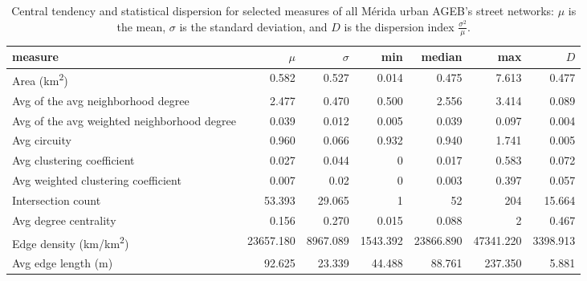 \begin{landscape}
\begin{table}[htbp]
  \centering
  \caption{Central tendency and statistical dispersion for selected measures of all Mérida urban AGEB's street networks: $\mu$ is the mean, $\sigma$ is the standard deviation, and $D$ is the dispersion index $\frac{\sigma ^ 2}{\mu}$.}
  \label{tab:measures_urban_agebs}
  \small
  \begin{tabular}{ l r r r r r r }
    \toprule
    measure                                          & $\mu$          & $\sigma$       & min            & median         & max            & $D$            \\
    \midrule
    Area (km\textsuperscript{2})                     & 0.582        & 0.527        & 0.014         & 0.475        & 7.613       & 0.477       \\
    Avg of the avg neighborhood degree               & 2.477          & 0.470          & 0.500          & 2.556          & 3.414          & 0.089          \\
    Avg of the avg weighted neighborhood degree      & 0.039          & 0.012          & 0.005          & 0.039          & 0.097          & 0.004          \\
    Avg circuity                                     & 0.960          & 0.066          & 0.932          & 0.940          & 1.741          & 0.005 \\
    Avg clustering coefficient                       & 0.027          & 0.044          & 0          & 0.017          & 0.583          & 0.072          \\
    Avg weighted clustering coefficient              & 0.007          & 0.02          & 0 & 0.003          & 0.397          & 0.057 \\
    Intersection count                               & 53.393          & 29.065          & 1            & 52           & 204         & 15.664      \\
    Avg degree centrality                            & 0.156          & 0.270          & 0.015 & 0.088          & 2          & 0.467          \\
    Edge density (km/km\textsuperscript{2})          & 23657.180         & 8967.089          & 1543.392          & 23866.890         & 47341.220         & 3398.913          \\
    Avg edge length (m)                              & 92.625        & 23.339         & 44.488        & 88.761        & 237.350        & 5.881          \\

\end{tabular}
\end{table}
\end{landscape}
